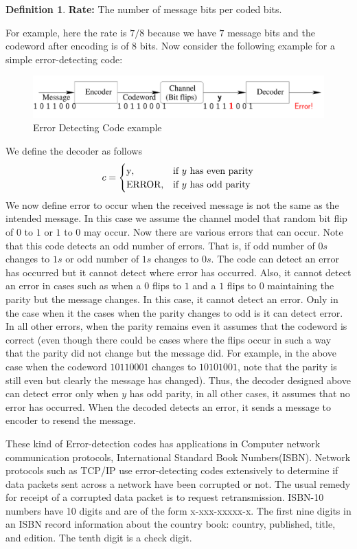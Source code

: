 \documentclass[12pt, oneside]{book}
\theoremstyle{definition}
\newtheorem{definition}{Definition}[section]
\theoremstyle{definition}
\theoremstyle{remark}
\begin{document}
\begin{definition}
    \textbf{Rate:} The number of message bits per coded bits.
\end{definition}
For example, here the rate is $7/8$ because we have $7$ message bits and the codeword after encoding is of $8$ bits. Now consider the following example for a simple error-detecting code:
\begin{figure}[h]
    \centering
    \includegraphics[width=0.75\linewidth]{Images/err-det-exa.png}
    \caption{Error Detecting Code example}
    \label{fig:err-exam}
\end{figure}
We define the decoder as follows
\[
c = \begin{cases} 
$y$, & \text{if $y$ has even parity}\\
$ERROR$, &\text{if $y$ has odd parity} 
\end{cases}
\]
We now define error to occur when the received message is not the same as the intended message. In this case we assume the channel model that random bit flip of $0$ to $1$ or $1$ to $0$ may occur. Now there are various errors that can occur. Note that this code detects an odd number of errors. That is, if odd number of $0s$ changes to $1s$ or odd number of $1s$ changes to $0s$. The code can detect an error has occurred but it cannot detect where error has occurred. Also, it cannot detect an error in cases such as when a $0$ flips to $1$ and a $1$ flips to $0$ maintaining the parity but the message changes. In this case, it cannot detect an error. Only in the case when it the cases when the parity changes to odd is it can detect error. In all other errors, when the parity remains even it assumes that the codeword is correct (even though there could be cases where the flips occur in such a way that the parity did not change but the message did. For example, in the above case when the codeword $10110001$ changes to $10101001$, note that the parity is still even but clearly the message has changed). Thus, the decoder designed above can detect error only when $y$ has odd parity, in all other cases, it assumes that no error has occurred. When the decoded detects an error, it sends a message to encoder to resend the message.

These kind of Error-detection codes has applications in Computer network communication protocols, International Standard Book Numbers(ISBN). Network protocols such as TCP/IP use error-detecting codes extensively to determine if data packets sent across a network have been corrupted or not. The usual remedy for receipt of a corrupted data packet is to request retransmission. ISBN-10 numbers have 10 digits and are of the form x-xxx-xxxxx-x. The first nine digits in an ISBN record information about the country book: country, published, title, and edition. The tenth digit is a check digit.
\end{document}
